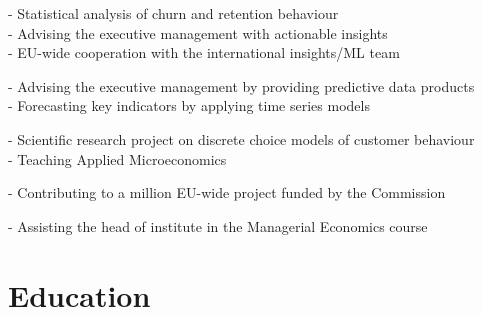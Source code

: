 \documentclass[a4paper]{twentysecondcv} %
\begin{document}
\begin{twenty}
{\small - Statistical analysis of churn and retention behaviour\\
            - Advising the executive management with actionable insights\\
            - EU-wide cooperation with the international insights/ML team
}

{\small - Advising the executive management by providing predictive data products\\
        - Forecasting key indicators by applying time series models
}

	
{\small - Scientific research project on discrete choice models of customer behaviour\\
        - Teaching Applied Microeconomics
}
	
{\small - Contributing to a  million EU-wide project funded by the Commission}
	
{\small - Assisting the head of institute in the Managerial Economics course} \\  \vspace{-0.5cm}
	
\end{twenty}






\section{Education}
\end{document}
